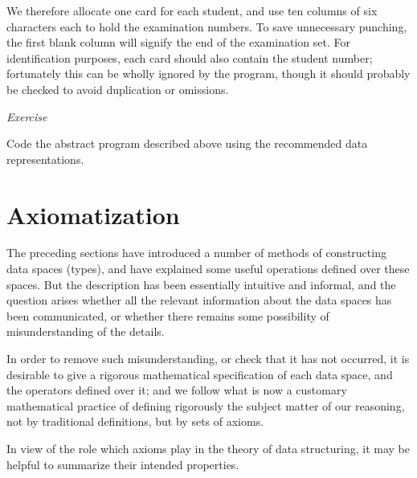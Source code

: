 We therefore allocate one card for each student, and use ten columns of six characters each to hold the examination numbers. To save unnecessary punching, the first blank column will signify the end of the examination set. For identification purposes, each card should also contain the student number; fortunately this can be wholly ignored by the program, though it should probably be checked to avoid duplication or omissions.

\noindent
\textit{Exercise}
\nopagebreak

\noindent
Code the abstract program described above using the recommended data representations.

\section{Axiomatization}

The preceding sections have introduced a number of methods of constructing data spaces (types), and have explained some useful operations defined over these spaces. But the description has been essentially intuitive and informal, and the question arises whether all the relevant information about the data spaces has been communicated, or whether there remains some possibility of misunderstanding of the details.

In order to remove such misunderstanding, or check that it has not occurred, it is desirable to give a rigorous mathematical specification of each data space, and the operators defined over it; and we follow what is now a customary mathematical practice of defining rigorously the subject matter of our reasoning, not by traditional definitions, but by sets of axioms.

In view of the role which axioms play in the theory of data structuring, it may be helpful to summarize their intended properties.

